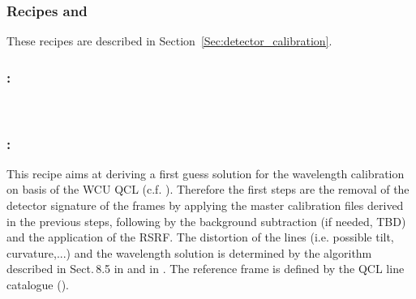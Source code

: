 \subsubsection{Recipes  and }
These recipes are described in Section~\ref{Sec:detector_calibration}.

\subsubsection{:}
\\

\subsubsection{:}
This recipe aims at deriving a first guess solution for the wavelength calibration on basis of the \ac{WCU} \ac{QCL} (c.f. \cite{METIS-calibration_plan}). Therefore the first steps are the removal of the detector signature of the  frames by applying the master calibration files derived in the previous steps, following by the background subtraction (if needed, TBD) and the application of the RSRF. The distortion of the lines (i.e. possible tilt, curvature,...) and the wavelength solution is determined by the algorithm described in Sect.\,8.5 in \cite{DRLS} and in \cite{METIS-calibration_plan}. The reference frame is defined by the \ac{QCL} line catalogue ().

